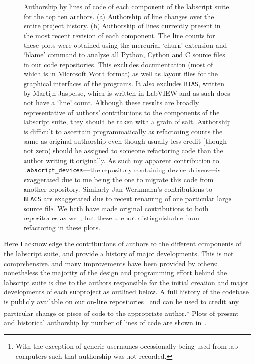 \begin{figure}
    \caption{Authorship by lines of code of each component of the labscript suite, for the top ten authors. (a) Authorship of line changes over the entire project history. (b) Authorship of lines currently present in the most recent revision of each component. The line counts for these plots were obtained using the mercurial `churn' extension and `blame' command to analyse all Python, Cython and C source files in our code repositories. This excludes documentation (most of which is in Microsoft Word format) as well as layout files for the graphical interfaces of the programs. It also excludes \texttt{BIAS}, written by Martijn Jasperse, which is written in LabVIEW and as such does not have a `line' count. Although these results are broadly representative of authors' contributions to the components of the labscript suite, they should be taken with a grain of salt. Authorship is difficult to ascertain programmatically as refactoring counts the same as original authorship even though usually less credit (though not zero) should be assigned to someone refactoring code than the author writing it originally. As such my apparent contribution to \texttt{labscript\_devices}---the repository containing device drivers---is exaggerated due to me being the one to migrate this code from another repository. Similarly Jan Werkmann's contributions to \texttt{BLACS} are exaggerated due to recent renaming of one particular large source file. We both have made original contributions to both repositories as well, but these are not distinguishable from refactoring in these plots.}\label{fig:line_counts}
\end{figure}

Here I acknowledge the contributions of authors to the different components of the labscript suite, and provide a history of major developments. This is not comprehensive, and many improvements have been provided by others; nonetheless the majority of the design and programming effort behind the labscript suite is due to the authors responsible for the initial creation and major developments of each subproject as outlined below. A full history of the codebase is publicly available on our on-line repositories~\cite{monash_univeristy_labscript_2018, starkey_qtutils_2018, billington_zprocess_2018} and can be used to credit any particular change or piece of code to the appropriate author.\footnote{With the exception of generic usernames occasionally being used from lab computers such that authorship was not recorded.} Plots of present and historical authorship by number of lines of code are shown in~.

